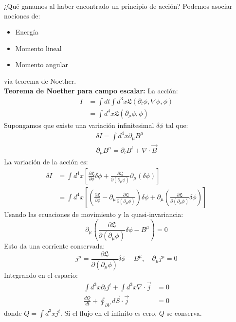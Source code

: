 \documentclass[../main.tex]{subfiles}
\begin{document}
¿Qué ganamos al haber encontrado un principio de acción? Podemos asociar nociones de:
\begin{itemize}
  \item Energía
  \item Momento lineal
  \item Momento angular 
\end{itemize}
vía teorema de Noether. \\

\textbf{Teorema de Noether para campo escalar:}
La acción:
\begin{align*}
  I & = \int dt \int d^3x  \mathfrak{L}(\partial_t \phi, \nabla \phi, \phi) \\
  & = \int d^4x  \mathfrak{L}(\partial_\mu \phi, \phi)
\end{align*}
Supongamos que existe una variación infinitesimal $\delta \phi$ tal que:
\begin{align*}
  \delta I = \int d^4x  \partial_\mu B^\mu \\
  \partial_\mu B^\mu = \partial_t B^t + \nabla \cdot \vec{B}
\end{align*}
La variación de la acción es:
\begin{align*}
  \delta I & = \int d^4x \left[ \frac{\partial\mathfrak{L}}{\partial \phi}\delta \phi + \frac{\partial \mathfrak{L}}{\partial (\partial_\mu \phi)} \partial_\mu (\delta \phi) \right] \\
  & = \int d^4x \left[ \left( \frac{\partial \mathfrak{L}}{\partial\phi} - \partial_\mu \frac{\partial \mathfrak{L}}{\partial(\partial_\mu\phi)} \right) \delta \phi + \partial_\mu \left( \frac{\partial \mathfrak{L}}{\partial(\partial_\mu \phi)} \delta\phi \right) \right]
\end{align*}
Usando las ecuaciones de movimiento y la quasi-invariancia:
\begin{equation}
  \partial_\mu \left( \frac{\partial \mathfrak{L}}{\partial(\partial_\mu \phi)}\delta\phi - B^\mu \right) = 0
\end{equation}
Esto da una corriente conservada:
\begin{equation}
  j^\mu = \frac{\partial \mathfrak{L}}{\partial(\partial_\mu \phi)}\delta\phi - B^\mu, \quad \partial_\mu j^\mu = 0
\end{equation}
Integrando en el espacio:
\begin{align*}
  \int d^3x  \partial_t j^t + \int d^3x  \nabla \cdot \vec{j} & = 0 \\
  \frac{dQ}{dt} + \oint_{\partial V} d\vec{S} \cdot \vec{j} & = 0
\end{align*}
donde $Q = \int d^3x  j^t$. Si el flujo en el infinito es cero, $Q$ se conserva.
\end{document}
